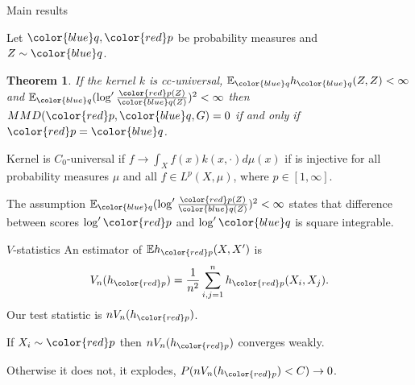\documentclass{beamer}
\newtheorem{thm}{Theorem}
\begin{document}
\begin{frame}{Main results}

Let ${ \color{blue} q},{\color{red} p}$ be probability measures and $Z\sim { \color{blue} q}$. 
\begin{thm}
 If the kernel $k$ is cc-universal, $\ev_{{ \color{blue} q}} h_{{ \color{blue} q}}(Z,Z)<\infty$ and $\ev_{{ \color{blue} q}} (\log' \frac{{\color{red} p}(Z)}{{ \color{blue} q}(Z)})^{2}<\infty$
then $MMD({\color{red} p},{ \color{blue} q},G) =0$ if and only if ${\color{red} p}={ \color{blue} q}$.
\end{thm}

\vspace{10mm}
\footnotesize{
Kernel is $C_0$-universal if  $f \to \int_X f(x) k(x,\cdot) d\mu(x)$ if is injective for all probability measures $\mu$ and all  $f \in L^p(X,\mu)$, where  $p \in [1,\infty] $. 

The assumption $\ev_{{ \color{blue} q}} (\log' \frac{{\color{red} p}(Z)}{{ \color{blue} q}(Z)})^{2}<\infty$ states that difference between scores $\log' \color{red} p$ and $\log' \color{blue} q$  is square integrable. 
}

\end{frame} 


 
 \begin{frame}{$V$-statistics}
An estimator of $\ev h_{\color{red} p}(X,X')$ is
\[
 V_n(h_{\color{red} p}) = \frac {1} {n^2} \sum_{i,j=1}^n h_{\color{red} p}(X_i,X_j).
\]
Our test statistic is $ n V_n(h_{\color{red} p})$.

If $X_i \sim {\color{red} p}$ then $ n V_n(h_{\color{red} p})$  converges weakly. 

Otherwise it does not,  it explodes, $P(n V_n(h_{\color{red} p}) <C) \to 0$.
 \end{frame}
 
\end{document}
